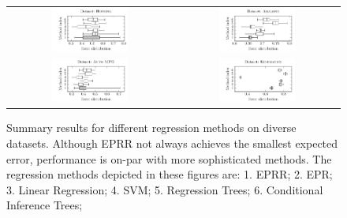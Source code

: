 \documentclass[preprint,authoryear,12pt]{elsarticle}
\begin{document}
\begin{figure}[tb]\begin{center}
\begin{tabular}{cc}
\includegraphics[width=0.48\textwidth]{figure_3a.pdf}
&
\includegraphics[width=0.48\textwidth]{figure_3b.pdf}
\\
\includegraphics[width=0.48\textwidth]{figure_3c.pdf}
&
\includegraphics[width=0.48\textwidth]{figure_3d.pdf}
\end{tabular}
%
\caption{Summary results for different regression methods on diverse datasets. Although \ac{EPRR} not always achieves the smallest expected error, performance is on-par with more sophisticated methods.  The regression methods depicted in these figures are: 1. \ac{EPRR}; 2. \ac{EPR}; 3. Linear Regression; 4. \ac{SVM}; 5. Regression Trees; 6. Conditional Inference Trees;}
\label{fig:four.datasets.summary}
\label{Housing_dataset_lambda0.8_25runs}
\label{Abalone_dataset_lambda0.8_25runs}
\label{Auto-Mpg_dataset_lambda0.8_25runs}
\label{Kinematics300_lambda0.8_25runs}
\end{center}\end{figure}
\end{document}
